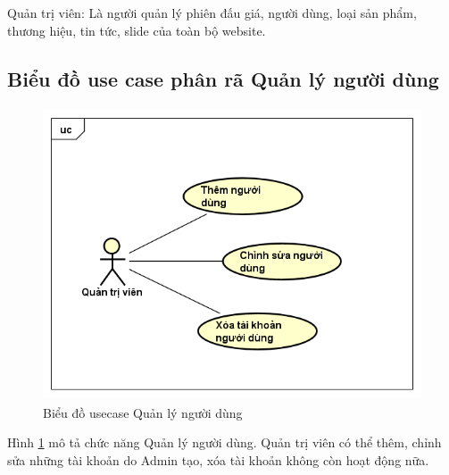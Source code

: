 \documentclass[../DoAn.tex]{subfiles}
\begin{document}
Quản trị viên: Là người quản lý phiên đấu giá, người dùng, loại sản phẩm, thương hiệu, tin tức, slide của toàn bộ website. 
\subsection{Biểu đồ use case phân rã Quản lý người dùng}
\begin{figure}[H]
    \centering
    \includegraphics[width=11.4cm,height=8.67cm]{Hinhve/uc quản lý người dùng.png}
    \caption{Biểu đồ usecase Quản lý người dùng}
    \label{fig:Fig22}
\end{figure}
Hình \ref{fig:Fig22} mô tả chức năng Quản lý người dùng. Quản trị viên có thể thêm, chỉnh sửa những tài khoản do Admin tạo, xóa tài khoản không còn hoạt động nữa.
\end{document}
